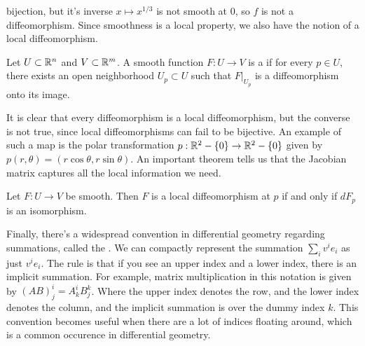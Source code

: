 bijection, but it's inverse $x \mapsto x^{1/3}$ is not smooth at $0$, so
$f$ is not a diffeomorphism. Since smoothness is a local property, we
also have the notion of a local diffeomorphism.
%
\begin{defn}
	Let $U \subset \mathbb{R}^n$ and $V \subset \mathbb{R}^m$. A smooth function
	$F : U \to V$ is a  if for every $p \in U$,
	there exists an open neighborhood $U_p \subset U$ such that
	$F\vert_{U_p}$ is a diffeomorphism onto its image.
\end{defn}
%
It is clear that every diffeomorphism is a local diffeomorphism, but
the converse is not true, since local diffeomorphisms can fail to be
bijective. An example of such a map is the polar transformation
$p : \mathbb{R}^2-\left\lbrace 0 \right\rbrace \to \mathbb{R}^2-\left\lbrace 0 \right\rbrace$ given by
$p(r,\theta) = (r\cos\theta,r\sin\theta)$. An important theorem tells us
that the Jacobian matrix captures all the local information we need.
%
\begin{thm}
	Let $F : U \to V$ be smooth. Then $F$ is a local diffeomorphism at $p$ if
	and only if $dF_p$ is an isomorphism.
\end{thm}
%
Finally, there's a widespread convention in differential geometry
regarding summations, called the . We
can compactly represent the summation $\sum_i v^ie_i$ as just $v^ie_i$.
The rule is that if you see an upper index and a lower index, there is
an implicit summation. For example, matrix multiplication in this
notation is given by $(AB)^i_j = A^i_kB^k_j$. Where the upper index denotes
the row, and the lower index denotes the column, and the implicit
summation is over the dummy index $k$. This convention becomes
useful when there are a lot of indices floating around, which is
a common occurence in differential geometry.
%
